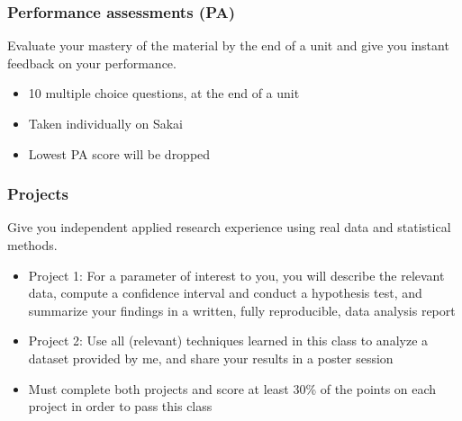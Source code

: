 \documentclass[slidestop,compress,mathserif,12pt,t,professionalfonts,xcolor=table]{beamer}
\begin{document}
\begin{frame}
\frametitle{Performance assessments (PA)}

 Evaluate your mastery of the material by the end of a unit and give 
you instant feedback on your performance.

\begin{itemize}

\item 10 multiple choice questions, at the end of a unit

\item Taken individually on Sakai

\item Lowest PA score will be dropped

\end{itemize}


\end{frame}


\begin{frame}
\frametitle{Projects}

 Give you independent applied research experience using real data and 
statistical methods.

\begin{itemize}

\item Project 1: For a parameter of interest to you, you will describe the relevant 
data, compute a confidence interval and conduct a hypothesis test, and summarize your 
findings in a written, fully reproducible, data analysis report

\item Project 2: Use all (relevant) techniques learned in this class to analyze a 
dataset provided by me, and share your results in a poster session

\item Must complete both projects and score at least 30\% of the points on each 
project in order to pass this class

\end{itemize}


\end{frame}
\end{document}
